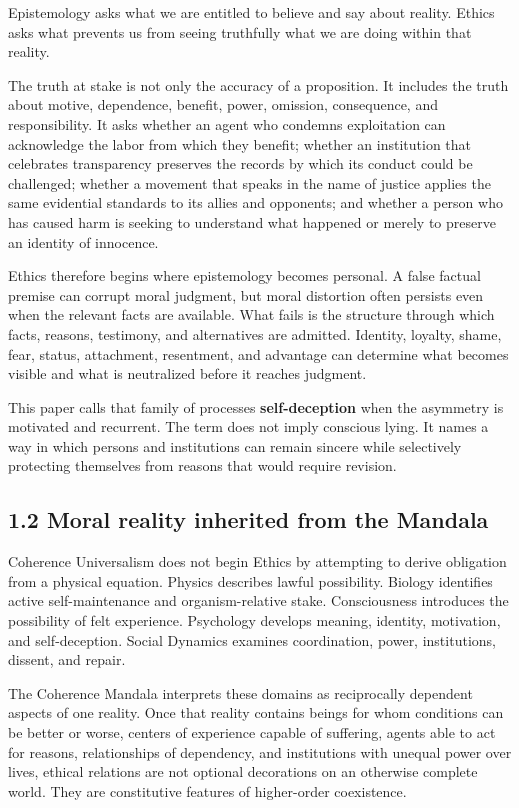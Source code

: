 \documentclass[
  11pt,
]{article}
\begin{document}
Epistemology asks what we are entitled to believe and say about reality.
Ethics asks what prevents us from seeing truthfully what we are doing
within that reality.

The truth at stake is not only the accuracy of a proposition. It
includes the truth about motive, dependence, benefit, power, omission,
consequence, and responsibility. It asks whether an agent who condemns
exploitation can acknowledge the labor from which they benefit; whether
an institution that celebrates transparency preserves the records by
which its conduct could be challenged; whether a movement that speaks in
the name of justice applies the same evidential standards to its allies
and opponents; and whether a person who has caused harm is seeking to
understand what happened or merely to preserve an identity of innocence.

Ethics therefore begins where epistemology becomes personal. A false
factual premise can corrupt moral judgment, but moral distortion often
persists even when the relevant facts are available. What fails is the
structure through which facts, reasons, testimony, and alternatives are
admitted. Identity, loyalty, shame, fear, status, attachment,
resentment, and advantage can determine what becomes visible and what is
neutralized before it reaches judgment.

This paper calls that family of processes \textbf{self-deception} when
the asymmetry is motivated and recurrent. The term does not imply
conscious lying. It names a way in which persons and institutions can
remain sincere while selectively protecting themselves from reasons that
would require revision.

\subsection{1.2 Moral reality inherited from the
Mandala}\label{moral-reality-inherited-from-the-mandala}

Coherence Universalism does not begin Ethics by attempting to derive
obligation from a physical equation. Physics describes lawful
possibility. Biology identifies active self-maintenance and
organism-relative stake. Consciousness introduces the possibility of
felt experience. Psychology develops meaning, identity, motivation, and
self-deception. Social Dynamics examines coordination, power,
institutions, dissent, and repair.

The Coherence Mandala interprets these domains as reciprocally dependent
aspects of one reality. Once that reality contains beings for whom
conditions can be better or worse, centers of experience capable of
suffering, agents able to act for reasons, relationships of dependency,
and institutions with unequal power over lives, ethical relations are
not optional decorations on an otherwise complete world. They are
constitutive features of higher-order coexistence.
\end{document}
